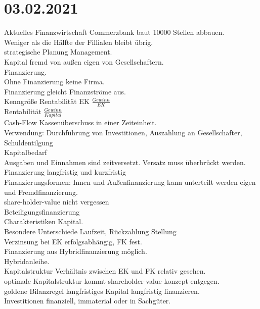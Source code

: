 \documentclass{article}
\begin{document}
	\section*{03.02.2021}
	Aktuelles Finanzwirtschaft Commerzbank baut 10000 Stellen abbauen. \\
	Weniger als die Hälfte der Fillialen bleibt übrig. \\
	strategische Planung Management. \\
	Kapital fremd von außen eigen von Gesellschaftern. \\
	Finanzierung. \\
	Ohne Finanzierung keine Firma. \\
	Finanzierung gleicht Finanzströme aus. \\
	Kenngröße Rentabilität EK $\frac{Gewinn}{EK}$ \\
	Rentabilität $\frac{Gewinn}{Kapital}$ \\
	Cash-Flow Kassenüberschuss in einer Zeiteinheit. \\
	Verwendung: Durchführung von Investitionen, Auszahlung an Gesellschafter, Schuldentilgung \\
	Kapitalbedarf \\
	Ausgaben und Einnahmen sind zeitversetzt. Versatz muss überbrückt werden. \\
	Finanzierung langfristig und kurzfristig \\
	Finanzierungsformen: Innen und Außenfinanzierung kann unterteilt werden eigen und Fremdfinanzierung. \\
	share-holder-value nicht vergessen \\
	Beteiligungsfinanzierung \\
	Charakteristiken Kapital. \\
	Besondere Unterschiede Laufzeit, Rückzahlung Stellung \\
	Verzinsung bei EK erfolgsabhängig, FK fest. \\
	Finanzierung aus Hybridfinanzierung möglich. \\
	Hybridanleihe. \\
	Kapitalstruktur Verhältnis zwischen EK und FK relativ gesehen. \\
	optimale Kapitalstruktur kommt shareholder-value-konzept entgegen. \\
	goldene Bilanzregel langfristiges Kapital langfristig finanzieren. \\
	Investitionen finanziell, immaterial oder in Sachgüter. \\
\end{document}
